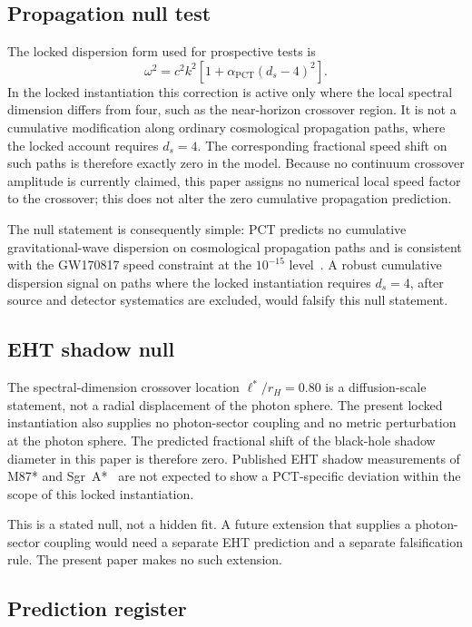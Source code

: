 ﻿\documentclass[12pt,a4paper]{article}
\theoremstyle{definition}
\begin{document}
\subsection{Propagation null test}
\label{sec:pred_propagation_null}

The locked dispersion form used for prospective tests is
\[
\omega^2 = c^2 k^2\left[1+\alpha_{\mathrm{PCT}}(d_s-4)^2\right].
\]
In the locked instantiation this correction is active only where the local spectral dimension differs from four, such as the near-horizon crossover region. It is not a cumulative modification along ordinary cosmological propagation paths, where the locked account requires $d_s=4$. The corresponding fractional speed shift on such paths is therefore exactly zero in the model. Because no continuum crossover amplitude is currently claimed, this paper assigns no numerical local speed factor to the crossover; this does not alter the zero cumulative propagation prediction.

The null statement is consequently simple: PCT predicts no cumulative gravitational-wave dispersion on cosmological propagation paths and is consistent with the GW170817 speed constraint at the $10^{-15}$ level~\citep{gw170817_speed}. A robust cumulative dispersion signal on paths where the locked instantiation requires $d_s=4$, after source and detector systematics are excluded, would falsify this null statement.

\subsection{EHT shadow null}
\label{sec:pred_eht_null}

The spectral-dimension crossover location $\ell^\ast/r_H=0.80$ is a diffusion-scale statement, not a radial displacement of the photon sphere. The present locked instantiation also supplies no photon-sector coupling and no metric perturbation at the photon sphere. The predicted fractional shift of the black-hole shadow diameter in this paper is therefore zero. Published EHT shadow measurements of M87* and Sgr~A*~\citep{eht_m87_shadow,eht_sgra_shadow} are not expected to show a PCT-specific deviation within the scope of this locked instantiation.

This is a stated null, not a hidden fit. A future extension that supplies a photon-sector coupling would need a separate EHT prediction and a separate falsification rule. The present paper makes no such extension.

\subsection{Prediction register}
\label{sec:prediction_register}
\end{document}
